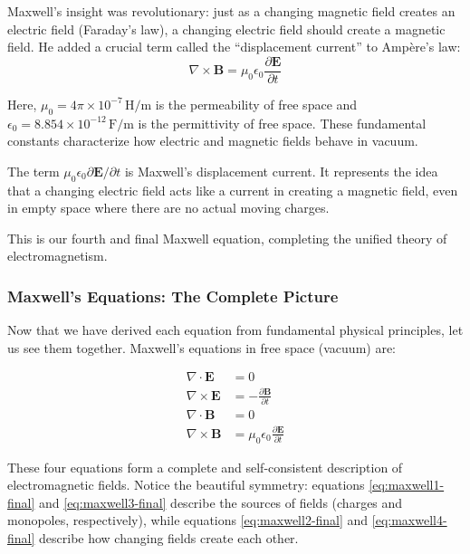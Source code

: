 Maxwell's insight was revolutionary: just as a changing magnetic field creates an electric field (Faraday's law), a changing electric field should create a magnetic field. He added a crucial term called the ``displacement current'' to Ampère's law:
\begin{equation}
\nabla \times \boldsymbol{B} = \mu_0 \epsilon_0 \frac{\partial \boldsymbol{E}}{\partial t} \label{eq:maxwell4}
\end{equation}

Here, $\mu_0 = 4\pi \times 10^{-7} \,\text{H/m}$ is the permeability of free space and $\epsilon_0 = 8.854 \times 10^{-12} \,\text{F/m}$ is the permittivity of free space. These fundamental constants characterize how electric and magnetic fields behave in vacuum.

The term $\mu_0 \epsilon_0 \partial \boldsymbol{E}/\partial t$ is Maxwell's displacement current. It represents the idea that a changing electric field acts like a current in creating a magnetic field, even in empty space where there are no actual moving charges.

This is our fourth and final Maxwell equation, completing the unified theory of electromagnetism.

\subsubsection{Maxwell's Equations: The Complete Picture}

Now that we have derived each equation from fundamental physical principles, let us see them together. Maxwell's equations in free space (vacuum) are:

\begin{align}
\nabla \cdot \boldsymbol{E} &= 0 \label{eq:maxwell1-final} \\
\nabla \times \boldsymbol{E} &= -\frac{\partial \boldsymbol{B}}{\partial t} \label{eq:maxwell2-final} \\
\nabla \cdot \boldsymbol{B} &= 0 \label{eq:maxwell3-final} \\
\nabla \times \boldsymbol{B} &= \mu_0 \epsilon_0 \frac{\partial \boldsymbol{E}}{\partial t} \label{eq:maxwell4-final}
\end{align}

These four equations form a complete and self-consistent description of electromagnetic fields. Notice the beautiful symmetry: equations \eqref{eq:maxwell1-final} and \eqref{eq:maxwell3-final} describe the sources of fields (charges and monopoles, respectively), while equations \eqref{eq:maxwell2-final} and \eqref{eq:maxwell4-final} describe how changing fields create each other.

